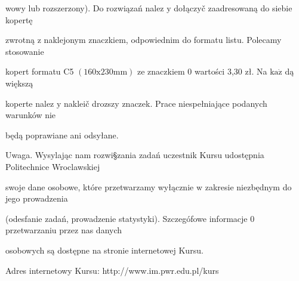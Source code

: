 \documentclass[a4paper,12pt]{article}
\begin{document}
wowy lub rozszerzony). Do rozwiązań nalez $\mathrm{y}$ dołączyč zaadresowaną do siebie kopertę

zwrotną $\mathrm{z}$ naklejonym znaczkiem, odpowiednim do formatu listu. Polecamy stosowanie

kopert formatu C5 $(160\mathrm{x}230\mathrm{m}\mathrm{m})$ ze znaczkiem $0$ wartości 3,30 zł. Na $\mathrm{k}\mathrm{a}\dot{\mathrm{z}}$ dą większą

koperte nalez $\mathrm{y}$ nakleič drozszy znaczek. Prace niespełniające podanych warunków nie

będą poprawiane ani odsyłane.

Uwaga. Wysylając nam rozwi\S zania zadań uczestnik Kursu udostępnia Politechnice Wroclawskiej

swoje dane osobowe, które przetwarzamy wyłącznie $\mathrm{w}$ zakresie niezbędnym do jego prowadzenia

(odesfanie zadań, prowadzenie statystyki). Szczegófowe informacje $0$ przetwarzaniu przez nas danych

osobowych są dostępne na stronie internetowej Kursu.

Adres internetowy Kursu: http://www.im.pwr.edu.pl/kurs
\end{document}
